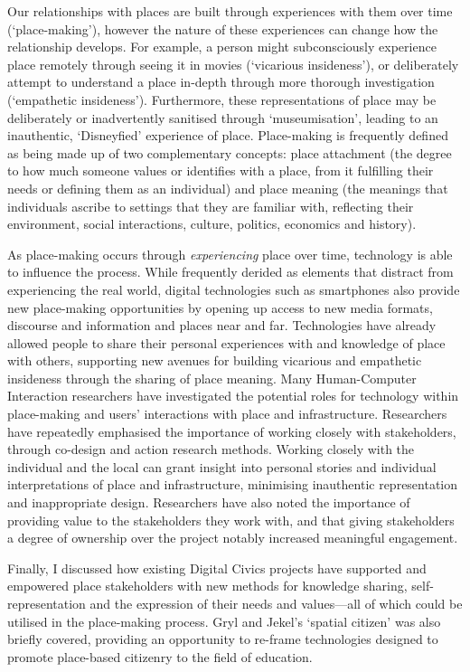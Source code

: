 Our relationships with places are built through experiences with them over time (`place-making'), however the nature of these experiences can change how the relationship develops. For example, a person might subconsciously experience place remotely through seeing it in movies (`vicarious insideness'), or deliberately attempt to understand a place in-depth through more thorough investigation (`empathetic insideness'). Furthermore, these representations of place may be deliberately or inadvertently sanitised through `museumisation', leading to an inauthentic, `Disneyfied' experience of place. Place-making is frequently defined as being made up of two complementary concepts: place attachment (the degree to how much someone values or identifies with a place, from it fulfilling their needs or defining them as an individual) and place meaning (the meanings that individuals ascribe to settings that they are familiar with, reflecting their environment, social interactions, culture, politics, economics and history). 

As place-making occurs through \textit{experiencing} place over time, technology is able to influence the process. While frequently derided as elements that distract from experiencing the real world, digital technologies such as smartphones also provide new place-making opportunities by opening up access to new media formats, discourse and information and places near and far. Technologies have already allowed people to share their personal experiences with and knowledge of place with others, supporting new avenues for building vicarious and empathetic insideness through the sharing of place meaning. Many Human-Computer Interaction researchers have investigated the potential roles for technology within place-making and users' interactions with place and infrastructure. Researchers have repeatedly emphasised the importance of working closely with stakeholders, through co-design and action research methods. Working closely with the individual and the local can grant insight into personal stories and individual interpretations of place and infrastructure, minimising inauthentic representation and inappropriate design. Researchers have also noted the importance of providing value to the stakeholders they work with, and that giving stakeholders a degree of ownership over the project notably increased meaningful engagement.

Finally, I discussed how existing Digital Civics projects have supported and empowered place stakeholders with new methods for knowledge sharing, self-representation and the expression of their needs and values---all of which could be utilised in the place-making process. Gryl and Jekel's `spatial citizen' was also briefly covered, providing an opportunity to re-frame technologies designed to promote place-based citizenry to the field of education.